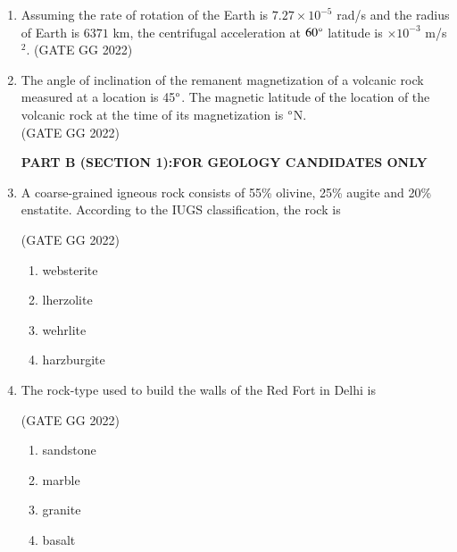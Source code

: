 \documentclass[journal]{IEEEtran}
\begin{document}
\begin{enumerate}[start=1]
\item Assuming the rate of rotation of the Earth is $7.27 \times 10^{-5}$ rad/s and the radius of Earth is $6371$ km, the centrifugal acceleration at $60\degree$ latitude is  \makebox[2cm]{\hrulefill}$\times 10^{-3}$ m/s$^2$. 
\hfill(GATE GG 2022)
\vspace{0.5cm}

\item The angle of inclination of the remanent magnetization of a volcanic rock measured at a location is 45$\degree$. The magnetic latitude of the location of the volcanic rock at the time of its magnetization is  \makebox[2cm]{\hrulefill}$\degree$N. \\
\hfill(GATE GG 2022)

\textbf{PART B (SECTION 1):FOR GEOLOGY CANDIDATES ONLY}
\vspace{0.5cm}

\item A coarse-grained igneous rock consists of 55\% olivine, 25\% augite and 20\% 
enstatite. According to the IUGS classification, the rock is  

\hfill(GATE GG 2022)
\begin{enumerate}
\item websterite
\item lherzolite
\item wehrlite
\item harzburgite
\end{enumerate}

\item The rock-type used to build the walls of the Red Fort in Delhi is  

\hfill(GATE GG 2022)
\begin{enumerate}
\item sandstone
\item marble
\item granite
\item basalt
\end{enumerate}


\end{enumerate}
\end{document}
